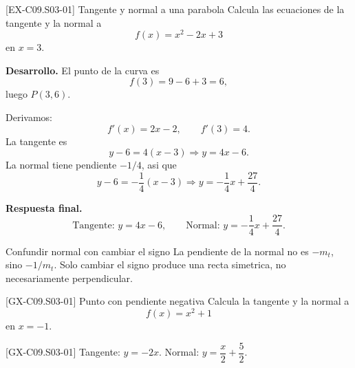 \begin{center}
\end{center}

\begin{solvedexample}{[EX-C09.S03-01] Tangente y normal a una parabola}
Calcula las ecuaciones de la tangente y la normal a
\[
f(x)=x^2-2x+3
\]
en \(x=3\).

\textbf{Desarrollo.} El punto de la curva es
\[
f(3)=9-6+3=6,
\]
luego \(P(3,6)\).

Derivamos:
\[
f'(x)=2x-2,\qquad f'(3)=4.
\]
La tangente es
\[
y-6=4(x-3)\Longrightarrow y=4x-6.
\]
La normal tiene pendiente \(-1/4\), asi que
\[
y-6=-\frac{1}{4}(x-3)\Longrightarrow y=-\frac{1}{4}x+\frac{27}{4}.
\]

\textbf{Respuesta final.}
\[
\text{Tangente: } y=4x-6,\qquad
\text{Normal: } y=-\frac{1}{4}x+\frac{27}{4}.
\]
\end{solvedexample}

\begin{commonerror}{Confundir normal con cambiar el signo}
La pendiente de la normal no es \(-m_t\), sino \(-1/m_t\). Solo cambiar el signo produce una
recta simetrica, no necesariamente perpendicular.
\end{commonerror}

\begin{guidedexercise}{[GX-C09.S03-01] Punto con pendiente negativa}
Calcula la tangente y la normal a
\[
f(x)=x^2+1
\]
en \(x=-1\).
\end{guidedexercise}

\begin{shortanswer}{[GX-C09.S03-01]}
Tangente: \(y=-2x\). Normal: \(y=\dfrac{x}{2}+\dfrac{5}{2}\).
\end{shortanswer}

